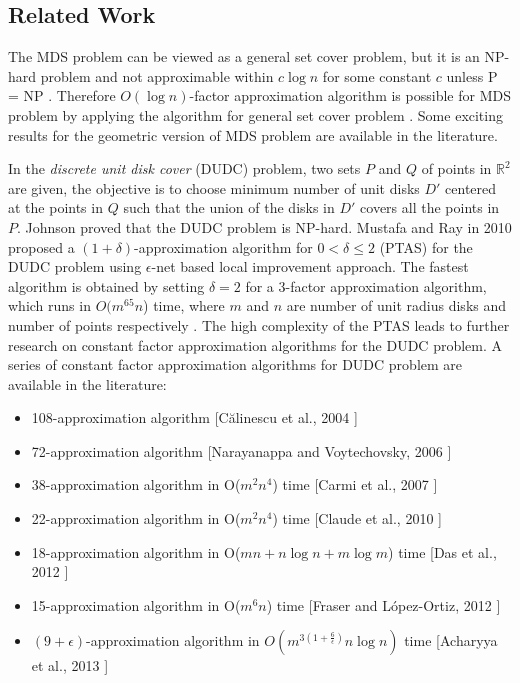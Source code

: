 \documentclass[a4paper,11pt]{article}
\newcommand{\IR}{\mathbb{R}}
\begin{document}
\subsection{Related Work}
The MDS problem can be viewed as a general set cover problem, but it is an NP-hard problem \cite{GJ79,J82} 
and not approximable within $c \log n$ for some constant $c$ unless P = NP \cite{RS97}. Therefore 
$O(\log n)$-factor approximation algorithm is possible for MDS problem by applying the algorithm for 
general set cover problem \cite{chvatal79}. Some exciting results for the geometric version of MDS problem 
are available in the literature. 

In the {\it discrete unit disk cover} (DUDC) problem, two sets $P$ and $Q$ of points in $\IR^2$ are given, the 
objective is to choose minimum number of unit disks $D'$ centered at the points in $Q$ such that 
the union of the disks in $D'$ covers all the points in $P$. Johnson \cite{J82} proved that 
the DUDC problem is NP-hard. Mustafa and Ray in 2010 \cite{MR10} proposed a $(1+\delta)$-approximation 
algorithm for $0 < \delta \leq 2$ (PTAS) for the DUDC problem using $\epsilon$-net based local improvement approach. 
The fastest algorithm is obtained by setting $\delta = 2$ for a 3-factor approximation algorithm, which runs 
in $O(m^{65}n$) time, where $m$ and $n$ are number of unit radius disks and number of points respectively \cite{DFLN12}. 
The high complexity of the PTAS leads to further research on constant factor 
approximation algorithms for the DUDC problem. A series of constant factor approximation algorithms for DUDC 
problem are available in the literature: 

\begin{itemize}
\item 108-approximation algorithm [C\u{a}linescu et al., 2004 \cite{CMWZ04}]
\item 72-approximation algorithm [Narayanappa and Voytechovsky, 2006 \cite{NV06}]
\item 38-approximation algorithm in O($m^{2}n^{4}$) time [Carmi et al., 2007 \cite{CKL07}]
\item 22-approximation algorithm in O($m^{2}n^{4}$) time [Claude et al., 2010 \cite{CDDDFLNS10}]
\item 18-approximation algorithm in O($mn+n\log n+m\log m$) time [Das et al., 2012 \cite{DFLN12}]
\item 15-approximation algorithm in O($m^{6}n$) time [Fraser and L\'{o}pez-Ortiz, 2012 \cite{FL12}]
\item $(9+\epsilon)$-approximation algorithm in $O(m^{3(1+\frac{6}{\epsilon})} n \log n)$ time 
[Acharyya et al., 2013 \cite{ABD13}]
\end{itemize}
\end{document}
